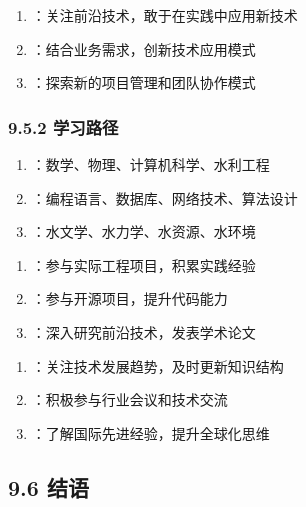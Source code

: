 
\begin{enumerate}
\def\labelenumi{\arabic{enumi}.}
\tightlist
\item
  ：关注前沿技术，敢于在实践中应用新技术
\item
  ：结合业务需求，创新技术应用模式
\item
  ：探索新的项目管理和团队协作模式
\end{enumerate}

\hypertarget{ux5b66ux4e60ux8defux5f84}{%
\subsubsection{9.5.2 学习路径}\label{ux5b66ux4e60ux8defux5f84}}


\begin{enumerate}
\def\labelenumi{\arabic{enumi}.}
\tightlist
\item
  ：数学、物理、计算机科学、水利工程
\item
  ：编程语言、数据库、网络技术、算法设计
\item
  ：水文学、水力学、水资源、水环境
\end{enumerate}


\begin{enumerate}
\def\labelenumi{\arabic{enumi}.}
\tightlist
\item
  ：参与实际工程项目，积累实践经验
\item
  ：参与开源项目，提升代码能力
\item
  ：深入研究前沿技术，发表学术论文
\end{enumerate}


\begin{enumerate}
\def\labelenumi{\arabic{enumi}.}
\tightlist
\item
  ：关注技术发展趋势，及时更新知识结构
\item
  ：积极参与行业会议和技术交流
\item
  ：了解国际先进经验，提升全球化思维
\end{enumerate}

\hypertarget{ux7ed3ux8bed}{%
\subsection{9.6 结语}\label{ux7ed3ux8bed}}

